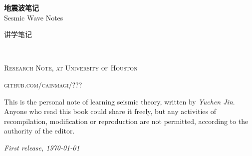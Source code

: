 \documentclass[mainfont=Libertine,Chinese]{CMNBook} %
\renewcommand{\FrameFolder}{FramePics/seismicbook/}
\begin{document}

\begingroup
\thispagestyle{empty}
\centering
\vspace*{5cm}
\begin{tcolorbox}[standard jigsaw, colframe=ocre, arc=16pt,
	opacityframe=1, opacityback=0.7]
	\centering
	\vspace*{0.5cm}
	\par\normalfont\fontsize{35}{35}\sffamily\selectfont
	\textbf{地震波笔记}\\
	{\LARGE Sesmic Wave Notes}\par %
	\vspace*{1cm}
	{\Huge 讲学笔记}\par %
	\vspace*{0.5cm}
\end{tcolorbox}
\endgroup


\newpage
~\vfill
\thispagestyle{empty}


\noindent \textsc{Research Note, at University of Houston}

\noindent \textsc{github.com/cainmagi/???} %

\noindent This is the personal note of learning seismic theory, written by \textit{Yuchen Jin}. Anyone who read this book could share it freely, but any activities of recompilation, modification or reproduction are not permitted, according to the authority of the editor. %

\noindent \textit{First release, \today} %



\pagestyle{empty} %

\renewcommand\contentsname{目~~录}
\tableofcontents %


\pagestyle{fancy} %



\end{document}
